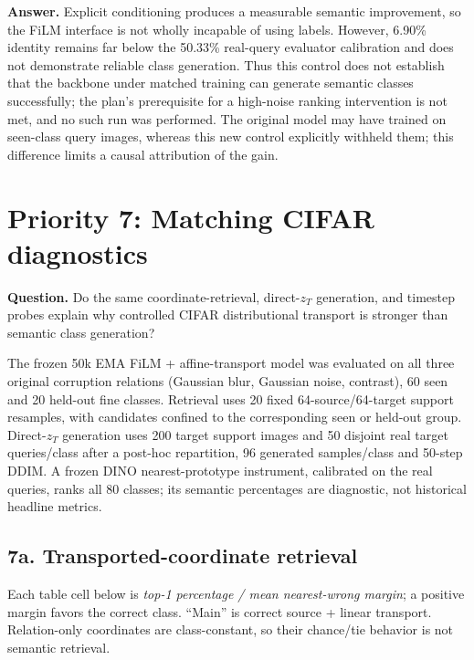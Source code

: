 \documentclass[10pt]{article}
\begin{document}
\textbf{Answer.} Explicit conditioning produces a measurable semantic improvement, so the FiLM interface is not wholly incapable of using labels. However, 6.90\% identity remains far below the 50.33\% real-query evaluator calibration and does not demonstrate reliable class generation. Thus this control does not establish that the backbone under matched training can generate semantic classes successfully; the plan's prerequisite for a high-noise ranking intervention is not met, and no such run was performed. The original model may have trained on seen-class query images, whereas this new control explicitly withheld them; this difference limits a causal attribution of the gain.

\section*{Priority 7: Matching CIFAR diagnostics}

\textbf{Question.} Do the same coordinate-retrieval, direct-$z_T$ generation, and timestep probes explain why controlled CIFAR distributional transport is stronger than semantic class generation?

The frozen 50k EMA FiLM + affine-transport model was evaluated on all three original corruption relations (Gaussian blur, Gaussian noise, contrast), 60 seen and 20 held-out fine classes. Retrieval uses 20 fixed 64-source/64-target support resamples, with candidates confined to the corresponding seen or held-out group. Direct-$z_T$ generation uses 200 target support images and 50 disjoint real target queries/class after a post-hoc repartition, 96 generated samples/class and 50-step DDIM. A frozen DINO nearest-prototype instrument, calibrated on the real queries, ranks all 80 classes; its semantic percentages are diagnostic, not historical headline metrics.

\newpage
\subsection*{7a. Transported-coordinate retrieval}

Each table cell below is \emph{top-1 percentage / mean nearest-wrong margin}; a positive margin favors the correct class. ``Main'' is correct source + linear transport. Relation-only coordinates are class-constant, so their chance/tie behavior is not semantic retrieval.
\end{document}
